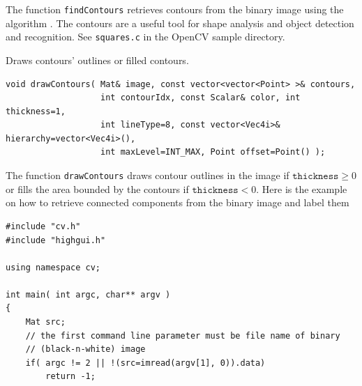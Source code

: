 The function \texttt{findContours} retrieves contours from the
binary image using the algorithm \cite{Suzuki85}. The contours are a useful tool for shape analysis and object detection and recognition. See \texttt{squares.c} in the OpenCV sample directory.

\label{drawContours}
Draws contours' outlines or filled contours.

\begin{lstlisting}
void drawContours( Mat& image, const vector<vector<Point> >& contours,
                   int contourIdx, const Scalar& color, int thickness=1,
                   int lineType=8, const vector<Vec4i>& hierarchy=vector<Vec4i>(),
                   int maxLevel=INT_MAX, Point offset=Point() );
\end{lstlisting}
\begin{description}

The function \texttt{drawContours} draws contour outlines in the image if $\texttt{thickness} \ge 0$ or fills the area bounded by the contours if $ \texttt{thickness}<0$. Here is the example on how to retrieve connected components from the binary image and label them

\begin{lstlisting}
#include "cv.h"
#include "highgui.h"

using namespace cv;

int main( int argc, char** argv )
{
    Mat src;
    // the first command line parameter must be file name of binary 
    // (black-n-white) image
    if( argc != 2 || !(src=imread(argv[1], 0)).data)
        return -1;


\end{lstlisting}
\end{description}
